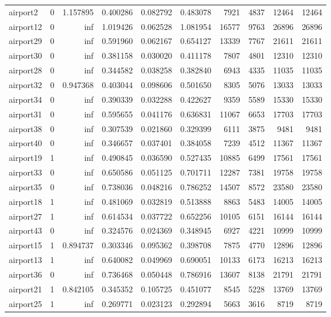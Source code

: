 \begin{longtable}{|l|r|r|r|r|r|r|r|r|r|}
airport2 & 0 & 1.157895 & 0.400286 & 0.082792 & 0.483078 & 7921 & 4837 & 12464 & 12464 \\
airport12 & 0 & inf & 1.019426 & 0.062528 & 1.081954 & 16577 & 9763 & 26896 & 26896 \\
airport29 & 0 & inf & 0.591960 & 0.062167 & 0.654127 & 13339 & 7767 & 21611 & 21611 \\
airport30 & 0 & inf & 0.381158 & 0.030020 & 0.411178 & 7807 & 4801 & 12310 & 12310 \\
airport28 & 0 & inf & 0.344582 & 0.038258 & 0.382840 & 6943 & 4335 & 11035 & 11035 \\
airport32 & 0 & 0.947368 & 0.403044 & 0.098606 & 0.501650 & 8305 & 5076 & 13033 & 13033 \\
airport34 & 0 & inf & 0.390339 & 0.032288 & 0.422627 & 9359 & 5589 & 15330 & 15330 \\
airport31 & 0 & inf & 0.595655 & 0.041176 & 0.636831 & 11067 & 6653 & 17703 & 17703 \\
airport38 & 0 & inf & 0.307539 & 0.021860 & 0.329399 & 6111 & 3875 & 9481 & 9481 \\
airport40 & 0 & inf & 0.346657 & 0.037401 & 0.384058 & 7239 & 4512 & 11367 & 11367 \\
airport19 & 1 & inf & 0.490845 & 0.036590 & 0.527435 & 10885 & 6499 & 17561 & 17561 \\
airport33 & 0 & inf & 0.650586 & 0.051125 & 0.701711 & 12287 & 7381 & 19758 & 19758 \\
airport35 & 0 & inf & 0.738036 & 0.048216 & 0.786252 & 14507 & 8572 & 23580 & 23580 \\
airport18 & 1 & inf & 0.481069 & 0.032819 & 0.513888 & 8863 & 5483 & 14005 & 14005 \\
airport27 & 1 & inf & 0.614534 & 0.037722 & 0.652256 & 10105 & 6151 & 16144 & 16144 \\
airport43 & 0 & inf & 0.324576 & 0.024369 & 0.348945 & 6927 & 4221 & 10999 & 10999 \\
airport15 & 1 & 0.894737 & 0.303346 & 0.095362 & 0.398708 & 7875 & 4770 & 12896 & 12896 \\
airport13 & 1 & inf & 0.640082 & 0.049969 & 0.690051 & 10133 & 6173 & 16213 & 16213 \\
airport36 & 0 & inf & 0.736468 & 0.050448 & 0.786916 & 13607 & 8138 & 21791 & 21791 \\
airport21 & 1 & 0.842105 & 0.345352 & 0.105725 & 0.451077 & 8545 & 5228 & 13769 & 13769 \\
airport25 & 1 & inf & 0.269771 & 0.023123 & 0.292894 & 5663 & 3616 & 8719 & 8719 \\

\end{longtable}
